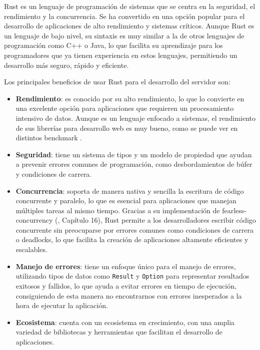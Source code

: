 Rust es un lenguaje de programación de sistemas que se centra en la seguridad, el rendimiento y la concurrencia. Se ha convertido en una opción popular para el desarrollo de aplicaciones de alto rendimiento y sistemas críticos.
Aunque Rust es un lenguaje de bajo nivel, su sintaxis es muy similar a la de otros lenguajes de programación como C++ o Java, lo que facilita su aprendizaje para los programadores que ya tienen experiencia en estos lenguajes, permitiendo un desarrollo más seguro, rápido y eficiente.

Los principales beneficios de usar Rust para el desarrollo del servidor son:

\begin{itemize}
    \item \textbf{Rendimiento}: es conocido por su alto rendimiento, lo que lo convierte en una excelente opción para aplicaciones que requieren un procesamiento intensivo de datos. Aunque es un lenguaje enfocado a sistemas, el rendimiento de sus librerías para desarrollo web es muy bueno, como se puede ver en distintos benchmark \parencite{rust-benchmark}.
    \item \textbf{Seguridad}: tiene un sistema de tipos y un modelo de propiedad que ayudan a prevenir errores comunes de programación, como desbordamientos de búfer y condiciones de carrera.
    \item \textbf{Concurrencia}: soporta de manera nativa y sencilla la escritura de código concurrente y paralelo, lo que es esencial para aplicaciones que manejan múltiples tareas al mismo tiempo.
        Gracias a su implementación de \gls{fearless-concurrency} (\cite{rustbook2024}, Capítulo 16), Rust permite a los desarrolladores escribir código concurrente sin preocuparse por errores comunes como condiciones de carrera o deadlocks, lo que facilita la creación de aplicaciones altamente eficientes y escalables.
    \item \textbf{Manejo de errores}: tiene un enfoque único para el manejo de errores, utilizando tipos de datos como \texttt{Result} y \texttt{Option} para representar resultados exitosos y fallidos, lo que ayuda a evitar errores en tiempo de ejecución, consiguiendo de esta manera no encontrarnos con errores inesperados a la hora de ejecutar la aplicación.
    \item \textbf{Ecosistema}: cuenta con un ecosistema en crecimiento, con una amplia variedad de bibliotecas y herramientas que facilitan el desarrollo de aplicaciones.
\end{itemize}


